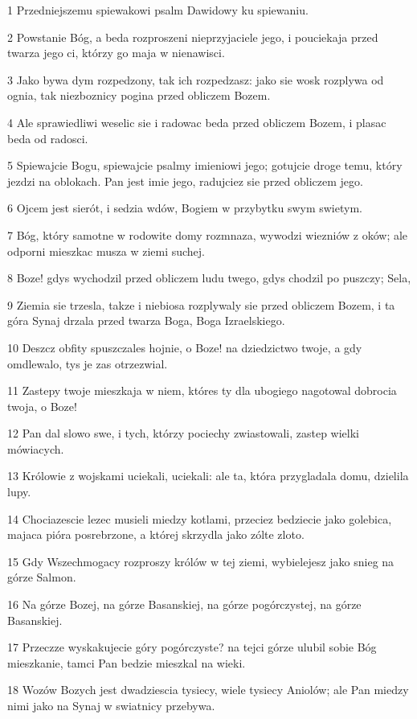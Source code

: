 \par 1 Przedniejszemu spiewakowi psalm Dawidowy ku spiewaniu.
\par 2 Powstanie Bóg, a beda rozproszeni nieprzyjaciele jego, i pouciekaja przed twarza jego ci, którzy go maja w nienawisci.
\par 3 Jako bywa dym rozpedzony, tak ich rozpedzasz: jako sie wosk rozplywa od ognia, tak niezboznicy pogina przed obliczem Bozem.
\par 4 Ale sprawiedliwi weselic sie i radowac beda przed obliczem Bozem, i plasac beda od radosci.
\par 5 Spiewajcie Bogu, spiewajcie psalmy imieniowi jego; gotujcie droge temu, który jezdzi na oblokach. Pan jest imie jego, radujciez sie przed obliczem jego.
\par 6 Ojcem jest sierót, i sedzia wdów, Bogiem w przybytku swym swietym.
\par 7 Bóg, który samotne w rodowite domy rozmnaza, wywodzi wiezniów z oków; ale odporni mieszkac musza w ziemi suchej.
\par 8 Boze! gdys wychodzil przed obliczem ludu twego, gdys chodzil po puszczy; Sela,
\par 9 Ziemia sie trzesla, takze i niebiosa rozplywaly sie przed obliczem Bozem, i ta góra Synaj drzala przed twarza Boga, Boga Izraelskiego.
\par 10 Deszcz obfity spuszczales hojnie, o Boze! na dziedzictwo twoje, a gdy omdlewalo, tys je zas otrzezwial.
\par 11 Zastepy twoje mieszkaja w niem, któres ty dla ubogiego nagotowal dobrocia twoja, o Boze!
\par 12 Pan dal slowo swe, i tych, którzy pociechy zwiastowali, zastep wielki mówiacych.
\par 13 Królowie z wojskami uciekali, uciekali: ale ta, która przygladala domu, dzielila lupy.
\par 14 Chociazescie lezec musieli miedzy kotlami, przeciez bedziecie jako golebica, majaca pióra posrebrzone, a której skrzydla jako zólte zloto.
\par 15 Gdy Wszechmogacy rozproszy królów w tej ziemi, wybielejesz jako snieg na górze Salmon.
\par 16 Na górze Bozej, na górze Basanskiej, na górze pogórczystej, na górze Basanskiej.
\par 17 Przeczze wyskakujecie góry pogórczyste? na tejci górze ulubil sobie Bóg mieszkanie, tamci Pan bedzie mieszkal na wieki.
\par 18 Wozów Bozych jest dwadziescia tysiecy, wiele tysiecy Aniolów; ale Pan miedzy nimi jako na Synaj w swiatnicy przebywa.
